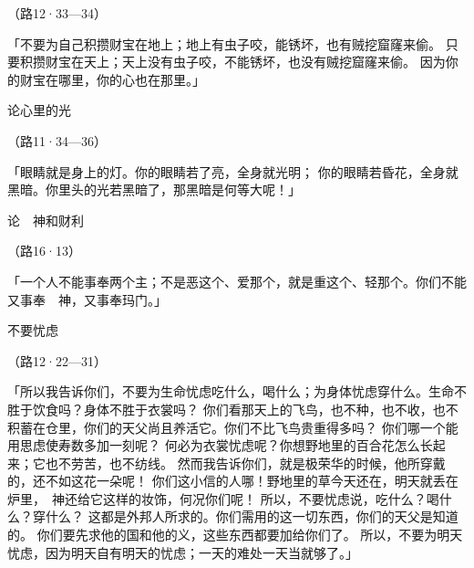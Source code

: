 {\par }{\R （路12·33—34）
\par }{\PP {}「不要为自己积攒财宝在地上；地上有虫子咬，能锈坏，也有贼挖窟窿来偷。
只要积攒财宝在天上；天上没有虫子咬，不能锈坏，也没有贼挖窟窿来偷。
因为你的财宝在哪里，你的心也在那里。」
\par }{\SH 论心里的光
\par }{\R （路11·34—36）
\par }{\PP {}「眼睛就是身上的灯。你的眼睛若了亮，全身就光明；
你的眼睛若昏花，全身就黑暗。你里头的光若黑暗了，那黑暗是何等大呢！」
\par }{\SH 论　神和财利
\par }{\R （路16·13）
\par }{\PP {}「一个人不能事奉两个主；不是恶这个、爱那个，就是重这个、轻那个。你们不能又事奉　神，又事奉玛门。」
\par }{\SH 不要忧虑
\par }{\R （路12·22—31）
\par }{\PP {}「所以我告诉你们，不要为生命忧虑吃什么，喝什么；为身体忧虑穿什么。生命不胜于饮食吗？身体不胜于衣裳吗？
你们看那天上的飞鸟，也不种，也不收，也不积蓄在仓里，你们的天父尚且养活它。你们不比飞鸟贵重得多吗？
你们哪一个能用思虑使寿数多加一刻呢？
何必为衣裳忧虑呢？你想野地里的百合花怎么长起来；它也不劳苦，也不纺线。
然而我告诉你们，就是{}极荣华的时候，他所穿戴的，还不如这花一朵呢！
你们这小信的人哪！野地里的草今天还在，明天就丢在炉里，　神还给它这样的妆饰，何况你们呢！
所以，不要忧虑说，吃什么？喝什么？穿什么？
这都是外邦人所求的。你们需用的这一切东西，你们的天父是知道的。
你们要先求他的国和他的义，这些东西都要加给你们了。
所以，不要为明天忧虑，因为明天自有明天的忧虑；一天的难处一天当就够了。」

}
